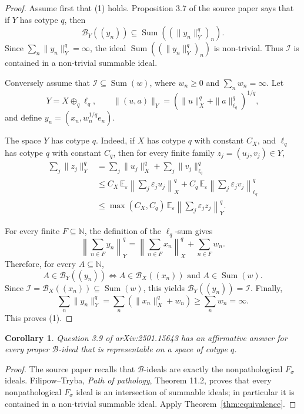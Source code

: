 \documentclass[11pt]{amsart}
\newtheorem{corollary}[theorem]{Corollary}
\newcommand{\N}{\mathbb N}
\newcommand{\I}{\mathcal I}
\newcommand{\B}{\mathcal B}
\newcommand{\Sum}{\operatorname{Sum}}
\begin{document}
\begin{proof}
Assume first that (1) holds.  Proposition 3.7 of the source paper says that if
\(Y\) has cotype \(q\), then
\[
  \B_Y((y_n))\subseteq \Sum((\|y_n\|_Y^q)_n).
\]
Since \(\sum_n\|y_n\|_Y^q=\infty\), the ideal
\(\Sum((\|y_n\|_Y^q)_n)\) is non-trivial.  Thus \(\I\) is contained in a
non-trivial summable ideal.

Conversely assume that \(\I\subseteq\Sum(w)\), where
\(w_n\ge 0\) and \(\sum_n w_n=\infty\).  Let
\[
  Y=X\oplus_q\ell_q,
  \qquad
  \|(u,a)\|_Y=(\|u\|_X^q+\|a\|_{\ell_q}^q)^{1/q},
\]
and define \(y_n=(x_n,w_n^{1/q}e_n)\).

The space \(Y\) has cotype \(q\).  Indeed, if \(X\) has cotype \(q\) with
constant \(C_X\), and \(\ell_q\) has cotype \(q\) with constant \(C_q\), then
for every finite family \(z_j=(u_j,v_j)\in Y\),
\[
\begin{aligned}
\sum_j \|z_j\|_Y^q
 &= \sum_j\|u_j\|_X^q+\sum_j\|v_j\|_{\ell_q}^q  \\
 &\le C_X\,\mathbb E_\varepsilon
       \left\|\sum_j\varepsilon_j u_j\right\|_X^q
     + C_q\,\mathbb E_\varepsilon
       \left\|\sum_j\varepsilon_j v_j\right\|_{\ell_q}^q  \\
 &\le \max(C_X,C_q)\,\mathbb E_\varepsilon
       \left\|\sum_j\varepsilon_j z_j\right\|_Y^q .
\end{aligned}
\]

For every finite \(F\subseteq\N\), the definition of the \(\ell_q\)-sum gives
\[
  \left\|\sum_{n\in F}y_n\right\|_Y^q
  =
  \left\|\sum_{n\in F}x_n\right\|_X^q
  +\sum_{n\in F}w_n .
\]
Therefore, for every \(A\subseteq\N\),
\[
  A\in \B_Y((y_n))
  \Longleftrightarrow
  A\in\B_X((x_n))\text{ and }A\in\Sum(w).
\]
Since \(\I=\B_X((x_n))\subseteq\Sum(w)\), this yields
\(\B_Y((y_n))=\I\).  Finally,
\[
  \sum_n\|y_n\|_Y^q
  =
  \sum_n(\|x_n\|_X^q+w_n)
  \ge \sum_n w_n
  =\infty .
\]
This proves (1).
\end{proof}

\begin{corollary}
\label{cor:question}
Question 3.9 of arXiv:2501.15643 has an affirmative answer for every proper
\(\B\)-ideal that is representable on a space of cotype \(q\).
\end{corollary}

\begin{proof}
The source paper recalls that \(\B\)-ideals are exactly the nonpathological
\(F_\sigma\) ideals.  Filipow--Tryba, \emph{Path of pathology},
Theorem 11.2, proves that every nonpathological \(F_\sigma\) ideal is an
intersection of summable ideals; in particular it is contained in a non-trivial
summable ideal.  Apply Theorem~\ref{thm:equivalence}.
\end{proof}
\end{document}
